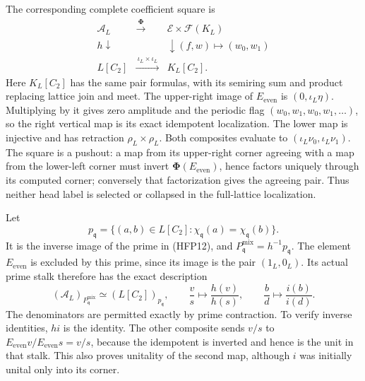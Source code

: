 The corresponding complete coefficient square is
\begin{equation}\tag{HFP35}
\begin{array}{ccc}
 \mathcal A_L&\xrightarrow{\ \boldsymbol\Phi\ }&
                    \mathcal E\times\mathcal F(K_L)\\
 {\scriptstyle h}\downarrow&&
       \downarrow{\scriptstyle(f,w)\mapsto(w_0,w_1)}\\
 L[C_2]&\xrightarrow{\ \iota_L\times\iota_L\ }&K_L[C_2].
\end{array}
\end{equation}
Here $K_L[C_2]$ has the same pair formulas, with its semiring
sum and product replacing lattice join and meet. The upper-right
image of $E_{\mathrm{even}}$ is $(0,\iota_L\eta)$.
Multiplying by it gives zero amplitude and the periodic flag
$(w_0,w_1,w_0,w_1,\ldots)$, so the right vertical map is
its exact idempotent localization. The lower map is injective
and has retraction $\rho_L\times\rho_L$.
Both composites evaluate to $(\iota_L\nu_0,\iota_L\nu_1)$.
The square is a pushout: a map from its upper-right corner
agreeing with a map from the lower-left corner must invert
$\boldsymbol\Phi(E_{\mathrm{even}})$, hence factors uniquely
through its computed corner; conversely that factorization
gives the agreeing pair. Thus neither head label is selected
or collapsed in the full-lattice localization.

Let
\begin{equation}\tag{HFP36}
 p_{\mathfrak q}=
   \{(a,b)\in L[C_2]:\chi_{\mathfrak q}(a)
                                  =\chi_{\mathfrak q}(b)\}.
\end{equation}
It is the inverse image of the prime in (HFP12), and
$P^{\mathrm{mix}}_{\mathfrak q}=h^{-1}p_{\mathfrak q}$.
The element $E_{\mathrm{even}}$ is excluded by this prime,
since its image is the pair $(1_L,0_L)$. Its actual prime
stalk therefore has the exact description
\begin{equation}\tag{HFP37}
 (\mathcal A_L)_{P^{\mathrm{mix}}_{\mathfrak q}}
       \simeq (L[C_2])_{p_{\mathfrak q}},\qquad
 \frac{v}{s}\longmapsto\frac{h(v)}{h(s)},\qquad
 \frac{b}{d}\longmapsto\frac{i(b)}{i(d)}.
\end{equation}
The denominators are permitted exactly by prime contraction.
To verify inverse identities, $hi$ is the identity. The
other composite sends $v/s$ to
$E_{\mathrm{even}}v/E_{\mathrm{even}}s=v/s$, because the
idempotent is inverted and hence is the unit in that stalk.
This also proves unitality of the second map, although $i$
was initially unital only into its corner.

